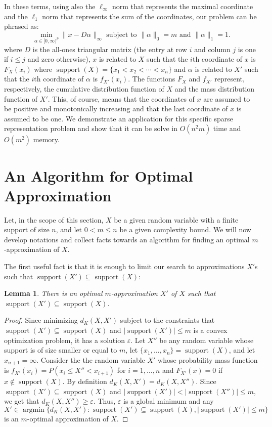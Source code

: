 \documentclass{article}
\newtheorem{lemma}[thm]{Lemma}
\DeclareMathOperator{\support}{support}
\begin{document}
In these terms, using also the $\ell_\infty$ norm that represents the maximal coordinate and the $\ell_1$ norm that represents the sum of the coordinates, our problem can be phrased as:
$$
\min_{\alpha \in [0,\infty)^p}\|x - D\alpha\|_{\infty} \text{ subject to }  \|\alpha\|_0 = m \text{ and } \|\alpha\|_1=1.
$$
where $D$ is the all-ones triangular matrix (the entry at row $i$ and column $j$ is one if $i\leq j$ and zero otherwise), $x$ is related to $X$ such that the $i$th coordinate of $x$ is $F_X(x_i)$ where $\support(X)=\{x_1 < x_2 < \cdots < x_n\}$ and $\alpha$ is related to $X'$ such that the $i$th coordinate of $\alpha$ is $f_{X'}(x_i)$. The functions $F_X$ and $f_{X'}$ represent, respectively, the cumulative distribution function of $X$ and the mass distribution function of $X'$. This, of course, means that the coordinates of $x$ are assumed to be positive and monotonically increasing and that the last coordinate of $x$ is assumed to be one. We demonstrate an application for this specific sparse representation problem and show that it can be solve in $O(n^2m)$ time and $O(m^2)$ memory.




\section{An Algorithm for Optimal Approximation}\label{sec:alg}
Let, in the scope of this section, $X$ be a given random variable with a finite support of size $n$, and let  $0<m\leq n$ be a given complexity bound. We will now develop notations and collect facts towards an algorithm for finding an optimal $m$-approximation of $X$.

The first useful fact is that it is enough to limit our search to approximations $X'$s such that $\support(X') \subseteq \support(X)$:

\begin{lemma}\label{lem:supContained}
	There is an optimal $m$-approximation $X'$ of $X$ such that $\support(X') \subseteq \support(X)$.
\end{lemma}
\begin{proof}
Since minimizing $d_K(X,X')$ subject to the constraints that $\support(X') \subseteq \support(X)$ and $|\support(X')| \leq m$ is a convex optimization problem, it has a solution $\varepsilon$. 
Let $X''$ be any random variable whose support is of size smaller or equal to $m$,  let $\{x_1,\dots,x_n\} = \support(X)$, and let $x_{n+1}=\infty$. Consider the the random variable $X'$ whose probability mass function is $f_{X'}(x_i) = P(x_i \leq X'' < x_{i+1})$ for $i=1,\dots,n$ and $F_{X'}(x)=0$ if $x\notin \support(X)$. By definition $d_{K}(X,X')=d_{K}(X,X'')$. Since $\support(X') \subseteq \support(X)$ and $|\support(X')|<|\support(X'')|\leq m$, we get that $d_{K}(X,X'') \geq \varepsilon$. Thus, $\varepsilon$ is a global minimum and any $X' \in \operatorname{argmin}\{ d_K(X,X')\colon \support(X') \subseteq \support(X), |\support(X')|\leq m \}$ is an $m$-optimal approximation of $X$.
\end{proof}
\end{document}
